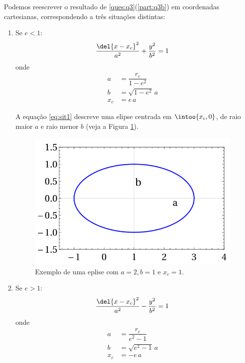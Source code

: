 \documentclass[]{IMTexam}
\begin{document}
\begin{questions}
\begin{parts}
		Podemos reescrever o resultado de \ref{ques:q3}(\ref{part:q3b}) em coordenadas cartesianas, correspondendo a três situações distintas:
		\begin{enumerate}
			\item Se $ e<1 $:
			      \begin{equation}\label{eq:sit1}
				      \dfrac{\del{x-x_c}^{2}}{a^{2}}+\dfrac{y^{2}}{b^{2}}=1\,
			      \end{equation}
			      onde
			      \begin{equation}\label{eq:sit1where}
				      \begin{aligned}
					      a   & =\dfrac{r_c}{1-e^{2}} \\
					      b   & =\sqrt{1-e^{2}}\,a    \\
					      x_c & =e\,a
				      \end{aligned}
			      \end{equation}

			      A equação \ref{eq:sit1} descreve uma elipse centrada em $ \intoo{x_c,0} $, de raio maior $ a $ e raio menor $ b $ (veja a	Figura \ref{fig:ellipseGraph}).

			      \begin{figure}[H]
				      \centering
				      \includegraphics[width=0.5\linewidth]{screenshot004}
				      \caption{Exemplo de uma eplise com $ a = 2, b = 1 $ e $ x_c = 1 $.}
				      \label{fig:ellipseGraph}
			      \end{figure}

			\item Se $ e>1 $:
			      \begin{equation}\label{eq:sit2}
				      \dfrac{\del{x-x_c}^{2}}{a^{2}}-\dfrac{y^{2}}{b^{2}}=1\,
			      \end{equation}
			      onde
			      \begin{equation}\label{eq:sit2where}
				      \begin{aligned}
					      a   & =\dfrac{r_c}{e^{2}-1} \\
					      b   & =\sqrt{e^{2}-1}\,a    \\
					      x_c & =-e\,a
				      \end{aligned}
			      \end{equation}


\end{enumerate}
\end{parts}
\end{questions}
\end{document}
